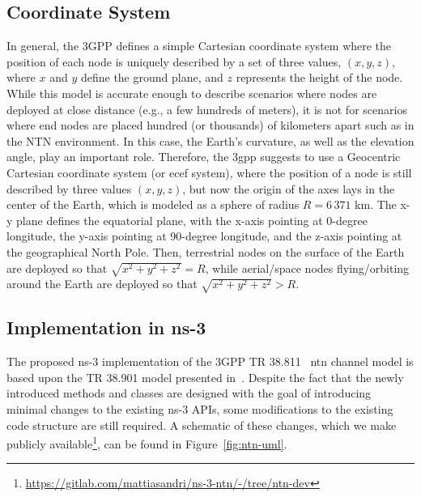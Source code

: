 \subsection{Coordinate System}
\label{sec:coord_model}
In general, the 3GPP defines a simple Cartesian coordinate system where the position of each node is uniquely described by a set of three values, $(x,y,z)$, where $x$ and $y$ define the ground plane, and $z$ represents the height of the node. 
While this model is accurate enough to describe scenarios where nodes are deployed at close distance (e.g., a few hundreds of meters), it is not for scenarios where end nodes are placed hundred (or thousands) of kilometers apart such as in the NTN environment. In this case, the Earth's curvature, as well as the elevation angle, play an important role.
Therefore, the \gls{3gpp} suggests to use a Geocentric Cartesian coordinate system (or \gls{ecef} system), where the position of a node is still described by three values $(x,y,z)$, but now the origin of the axes lays in the center of the Earth, which is modeled as a sphere of radius $R=6\,371$ km. 
The x-y plane defines the equatorial plane, with the x-axis pointing at 0-degree longitude, the y-axis pointing at 90-degree longitude, and the z-axis pointing at the geographical North Pole. 
Then, terrestrial nodes on the surface of the Earth are deployed so that $\sqrt{x^{2}+y^{2}+z^{2}}=R$, while aerial/space nodes flying/orbiting around the Earth are deployed so that $\sqrt{x^{2}+y^{2}+z^{2}}> R$.


\subsection{Implementation in ns-3}
\label{sec:implementation}
The proposed ns-3 implementation of the 3GPP TR 38.811~\cite{38811} \gls{ntn} channel model is based upon the TR 38.901 model presented in~\cite{zugno20implementation}. Despite the fact that the newly introduced methods and classes are designed with the goal of introducing minimal changes to the existing ns-3 APIs, %
some modifications to the existing code structure are still required. A schematic of these changes, which we make publicly available\footnote{\url{https://gitlab.com/mattiasandri/ns-3-ntn/-/tree/ntn-dev}}, can be found in Figure~\ref{fig:ntn-uml}.

